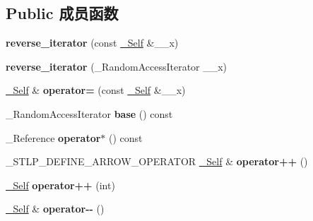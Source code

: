\subsection*{Public 成员函数}
\begin{DoxyCompactItemize}
\item 
\mbox{\label{classreverse__iterator_aee704842257923f1f7f692e55315766b}} 
{\bfseries reverse\+\_\+iterator} (const \hyperlink{classreverse__iterator}{\+\_\+\+Self} \&\+\_\+\+\_\+x)
\item 
\mbox{\label{classreverse__iterator_ac94b544790805913b169148c830037d2}} 
{\bfseries reverse\+\_\+iterator} (\+\_\+\+Random\+Access\+Iterator \+\_\+\+\_\+x)
\item 
\mbox{\label{classreverse__iterator_a8b486b345f8165ee269767a7321f2031}} 
\hyperlink{classreverse__iterator}{\+\_\+\+Self} \& {\bfseries operator=} (const \hyperlink{classreverse__iterator}{\+\_\+\+Self} \&\+\_\+\+\_\+x)
\item 
\mbox{\label{classreverse__iterator_ad1f1aad09bbedc2d353a75d239dab1e4}} 
\+\_\+\+Random\+Access\+Iterator {\bfseries base} () const
\item 
\mbox{\label{classreverse__iterator_a567c18e0b68f6e07affcd37c427bdcd2}} 
\+\_\+\+Reference {\bfseries operator$\ast$} () const
\item 
\mbox{\label{classreverse__iterator_ab835abebcb369f46138b907cefc72a9b}} 
\+\_\+\+S\+T\+L\+P\+\_\+\+D\+E\+F\+I\+N\+E\+\_\+\+A\+R\+R\+O\+W\+\_\+\+O\+P\+E\+R\+A\+T\+OR \hyperlink{classreverse__iterator}{\+\_\+\+Self} \& {\bfseries operator++} ()
\item 
\mbox{\label{classreverse__iterator_a41a8e007b60e7fbf7596d6ac45f87aad}} 
\hyperlink{classreverse__iterator}{\+\_\+\+Self} {\bfseries operator++} (int)
\item 
\mbox{\label{classreverse__iterator_a33b12924fe6530e5408b88642b63b34c}} 
\hyperlink{classreverse__iterator}{\+\_\+\+Self} \& {\bfseries operator-\/-\/} ()
\item 

\end{DoxyCompactItemize}
